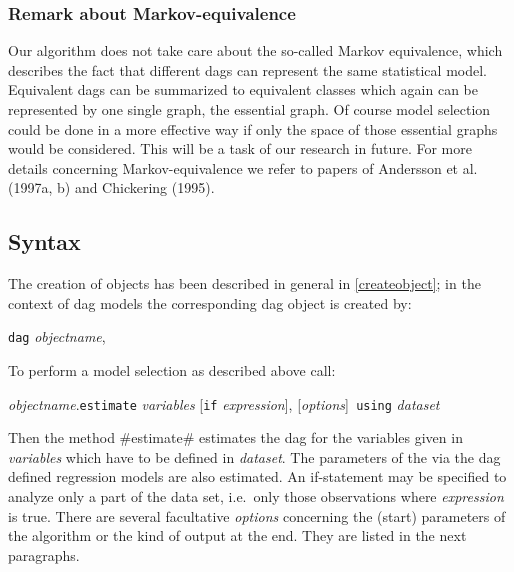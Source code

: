 \subsubsection*{Remark about Markov-equivalence}

Our algorithm does not take care about the so-called Markov
equivalence, which describes the fact that different dags can
represent the same statistical model. Equivalent dags can be
summarized to equivalent classes which again can be represented by
one single graph, the essential graph. Of course model selection
could be done in a more effective way if only the space of those
essential graphs would be considered. This will be a task of our
research in future. For more details concerning Markov-equivalence
we refer to papers of Andersson et al. (1997a, b) and Chickering
(1995).





\subsection{Syntax}
%
 
%
The creation of objects has been described in general in
\autoref{createobject}; in the context of dag models the
corresponding dag object is created by:

\begin{center}
{\texttt{dag} {\em objectname}},\\
\end{center}

To perform a model selection as described above call:

\begin{center}
{{\em objectname}.\texttt{estimate} {\em variables} [\texttt{if}
{\em expression}], [{\em options}]\texttt{ using} {\em dataset} }
\bigskip
\end{center}

Then the method #estimate# estimates the dag for the variables
given in {\it variables} which have to be defined in {\it
dataset}. The parameters of the via the dag defined regression
models are also estimated. An if-statement may be specified to
analyze only a part of the data set, i.e.~only those observations
where {\it expression} is true. There are several facultative {\it
options} concerning the (start) parameters of the algorithm or the
kind of output at the end. They are listed in the next paragraphs.

